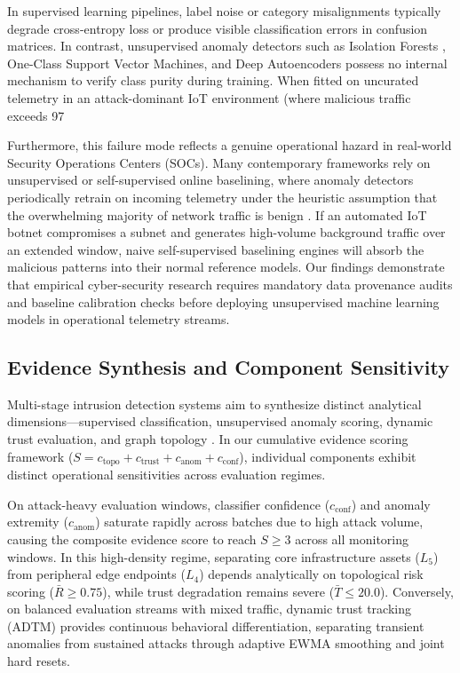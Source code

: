 \documentclass[journal,10pt,onecolumn]{IEEEtran}
\begin{document}
In supervised learning pipelines, label noise or category misalignments typically degrade cross-entropy loss or produce visible classification errors in confusion matrices. In contrast, unsupervised anomaly detectors such as Isolation Forests \cite{15}, One-Class Support Vector Machines, and Deep Autoencoders possess no internal mechanism to verify class purity during training. When fitted on uncurated telemetry in an attack-dominant IoT environment (where malicious traffic exceeds 97%

Furthermore, this failure mode reflects a genuine operational hazard in real-world Security Operations Centers (SOCs). Many contemporary frameworks rely on unsupervised or self-supervised online baselining, where anomaly detectors periodically retrain on incoming telemetry under the heuristic assumption that the overwhelming majority of network traffic is benign \cite{16, 17}. If an automated IoT botnet compromises a subnet and generates high-volume background traffic over an extended window, naive self-supervised baselining engines will absorb the malicious patterns into their normal reference models. Our findings demonstrate that empirical cyber-security research requires mandatory data provenance audits and baseline calibration checks before deploying unsupervised machine learning models in operational telemetry streams.


\subsection{Evidence Synthesis and Component Sensitivity}
Multi-stage intrusion detection systems aim to synthesize distinct analytical dimensions—supervised classification, unsupervised anomaly scoring, dynamic trust evaluation, and graph topology \cite{20, 30}. In our cumulative evidence scoring framework ($S = c_{\text{topo}} + c_{\text{trust}} + c_{\text{anom}} + c_{\text{conf}}$), individual components exhibit distinct operational sensitivities across evaluation regimes.

On attack-heavy evaluation windows, classifier confidence ($c_{\text{conf}}$) and anomaly extremity ($c_{\text{anom}}$) saturate rapidly across batches due to high attack volume, causing the composite evidence score to reach $S \ge 3$ across all monitoring windows. In this high-density regime, separating core infrastructure assets ($L_5$) from peripheral edge endpoints ($L_4$) depends analytically on topological risk scoring ($\bar{R} \ge 0.75$), while trust degradation remains severe ($\bar{T} \le 20.0$). Conversely, on balanced evaluation streams with mixed traffic, dynamic trust tracking (ADTM) provides continuous behavioral differentiation, separating transient anomalies from sustained attacks through adaptive EWMA smoothing and joint hard resets.
\end{document}
